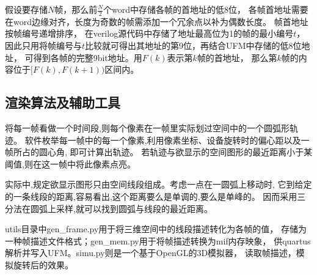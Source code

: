 假设要存储$N$帧，那么前$\frac{N}{2}$个word中存储各帧的首地址的低8位，
各帧首地址需要在word边缘对齐，长度为奇数的帧需添加一个冗余点以补为偶数长度。
帧首地址按帧编号递增排序，
在verilog源代码中存储了地址最高位为1的帧的最小编号$t$，
因此只用将帧编号与$t$比较就可得出其地址的第9位，再结合UFM中存储的低8位地址，
可得到各帧的完整9bit地址。用$F(k)$表示第$k$帧的首地址，
那么第$k$帧的内容位于$[F(k), F(k+1))$区间内。

\subsection{渲染算法及辅助工具}

将每一帧看做一个时间段,则每个像素在一帧里实际划过空间中的一个圆弧形轨迹。
软件枚举每一帧中的每一个像素,利用像素坐标、设备旋转时的偏心距以及一帧所占的圆心角,
即可计算出轨迹。
若轨迹与欲显示的空间图形的最近距离小于某阈值,则在这一帧中将此像素点亮。

实际中,规定欲显示图形只由空间线段组成。考虑一点在一圆弧上移动时,
它到给定的一条线段的距离,容易看出,这个距离要么是单调的,要么是单峰的。
因而采用三分法在圆弧上采样,就可以找到圆弧与线段的最近距离。

utils目录中gen\_frame.py用于将三维空间中的线段描述转化为各帧的值，
存储为一种帧描述文件格式；gen\_mem.py用于将帧描述转换为mif内存映象，
供quartus解析并写入UFM。simu.py则是一个基于OpenGL的3D模拟器，
读取帧描述，模拟旋转后的效果。





